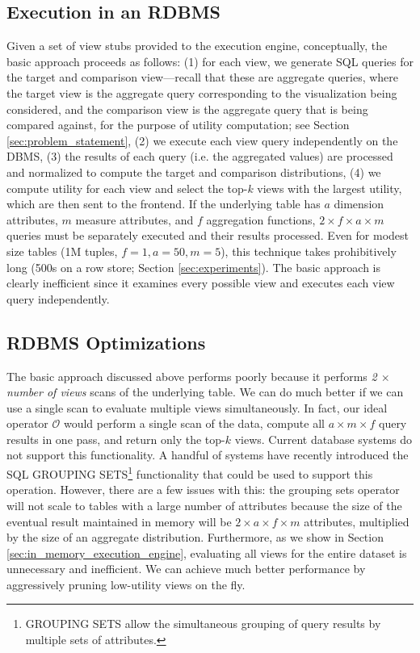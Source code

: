\subsection{Execution in an RDBMS}
\label{sec:basic_framework}
Given a set of view stubs provided to the execution engine, conceptually,
the basic approach proceeds as follows:
(1) for each view, we generate SQL queries for the target and
comparison view---recall that these are aggregate queries, where
the target view is the aggregate query corresponding 
to the visualization being considered, and the comparison
view is the aggregate query that is being compared against,
for the purpose of utility computation;
see Section \ref{sec:problem_statement}, 
(2) we execute each view query independently on the DBMS, 
(3) the results of each query (i.e. the aggregated values) are processed and
normalized to compute the target and comparison distributions, 
(4) we compute utility for each view 
and select the top-$k$ views with the largest utility,
which are then sent to the frontend.
If the underlying table has $a$ dimension attributes, $m$ measure attributes,
and $f$ aggregation functions, $2\times f \times a \times  m$ queries must be separately executed and their results
processed. Even for modest size tables (1M tuples, $f = 1, a = 50, m=5$), this
technique takes prohibitively long (500s on a row store; Section
\ref{sec:experiments}).
The basic approach is clearly inefficient since it examines every possible view and executes each view
query independently.

\subsection{RDBMS Optimizations} 
\label{sec:dbms_optimizations}
The basic approach discussed above performs poorly because it performs {\it 2
$\times$ number of views} scans of the underlying table. We can do much better
if we can use a single scan to evaluate multiple views simultaneously.
In fact, our ideal operator $\mathcal{O}$ would perform a single scan of the
data, compute all $a \times m \times f$ query results in one pass, and return
only the top-$k$ views.
Current database systems do not support this functionality.
A handful of systems have recently introduced the SQL GROUPING
SETS\footnote{GROUPING SETS allow the simultaneous grouping of query results by
multiple sets of attributes.} functionality that could be used to support this
operation. However, there are a few issues with this: the grouping sets
operator will not scale to tables with a large number of attributes because the 
size of the eventual result maintained in memory will be $2 \times a \times f
\times m$ attributes, multiplied by the size of an aggregate distribution.
Furthermore, as we show in Section \ref{sec:in_memory_execution_engine},
evaluating all views for the entire dataset is unnecessary and inefficient. 
We can achieve much better performance by aggressively pruning low-utility
views on the fly.

